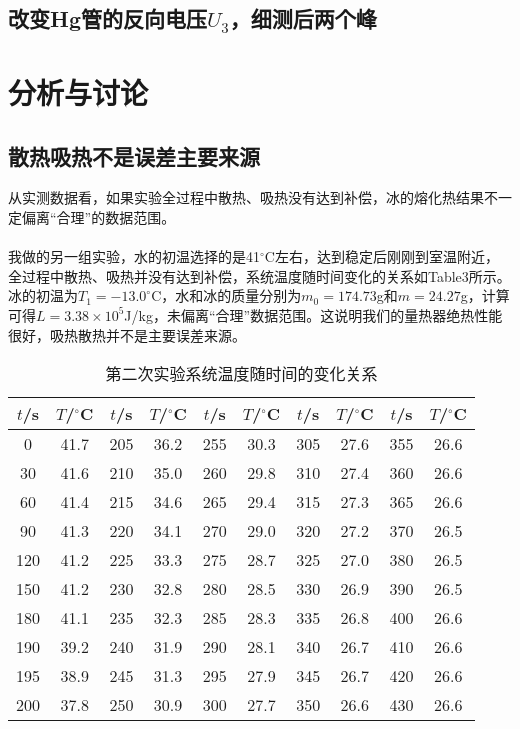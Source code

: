 \documentclass[a4paper,11pt]{article}
\begin{document}
\begin{CJK*}{UTF8}{gbsn}
\subsection{改变Hg管的反向电压$U_3$，细测后两个峰}

\section{分析与讨论}

\subsection{散热吸热不是误差主要来源}
从实测数据看，如果实验全过程中散热、吸热没有达到补偿，冰的熔化热结果不一定偏离“合理”的数据范围。\\ \\
我做的另一组实验，水的初温选择的是41$^\circ$C左右，达到稳定后刚刚到室温附近，全过程中散热、吸热并没有达到补偿，系统温度随时间变化的关系如Table3所示。冰的初温为$T_1=-13.0^\circ$C，水和冰的质量分别为$m_0=174.73$g和$m=24.27$g，计算可得$L=3.38\times 10^5$J/kg，未偏离“合理”数据范围。这说明我们的量热器绝热性能很好，吸热散热并不是主要误差来源。

\begin{table}[htbp]
\centering
\begin{tabular}{|c|c|c|c|c|c|c|c|c|c|}
\hline
$t$/s & $T$/$^\circ$C & $t$/s & $T$/$^\circ$C & $t$/s & $T$/$^\circ$C & $t$/s & $T$/$^\circ$C & $t$/s & $T$/$^\circ$C\\
\hline
0 & 41.7 & 205 & 36.2 & 255 & 30.3 & 305 & 27.6 & 355 & 26.6\\
\hline
30 & 41.6 & 210 & 35.0 & 260 & 29.8 & 310 & 27.4 & 360 & 26.6\\
\hline
60 & 41.4 & 215 & 34.6 & 265 & 29.4 & 315 & 27.3 & 365 & 26.6\\
\hline
90 & 41.3 & 220 & 34.1 & 270 & 29.0 & 320 & 27.2 & 370 & 26.5\\
\hline
120 & 41.2 & 225 & 33.3 & 275 & 28.7 & 325 & 27.0 & 380 & 26.5\\
\hline
150 & 41.2 & 230 & 32.8 & 280 & 28.5 & 330 & 26.9 & 390 & 26.5\\
\hline
180 & 41.1 & 235 & 32.3 & 285 & 28.3 & 335 & 26.8 & 400 & 26.6\\
\hline
190 & 39.2 & 240 & 31.9 & 290 & 28.1 & 340 & 26.7 & 410 & 26.6\\
\hline
195 & 38.9 & 245 & 31.3 & 295 & 27.9 & 345 & 26.7 & 420 & 26.6\\
\hline
200 & 37.8 & 250 & 30.9 & 300 & 27.7 & 350 & 26.6 & 430 & 26.6\\
\hline
\end{tabular}\\
\caption{第二次实验系统温度随时间的变化关系}
\end{table}


\end{CJK*}
\end{document}
